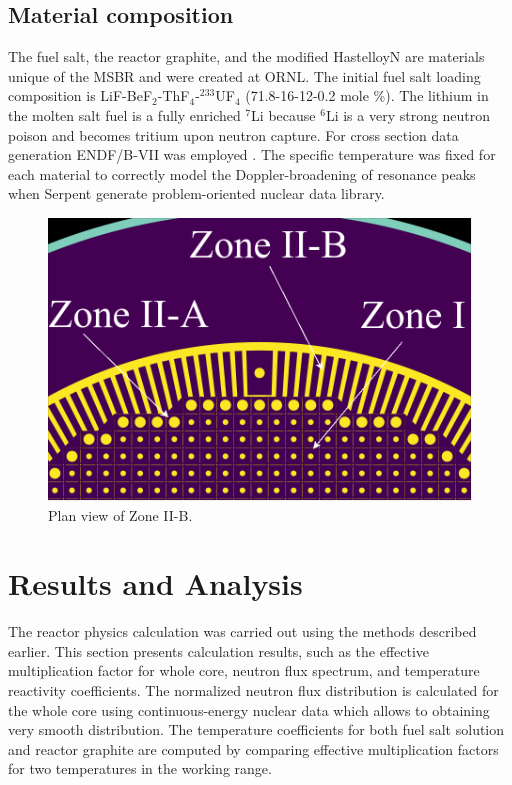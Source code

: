 \documentclass{anstrans}
\begin{document}
\subsection{Material composition}
The fuel salt, the reactor graphite, and the modified HastelloyN are materials 
unique of the \gls{MSBR} and were created at \gls{ORNL}. The initial fuel salt loading composition is LiF-BeF$_2$-ThF$_4$-$^{233}$UF$_4$ (71.8-16-12-0.2 mole \%). The lithium in the molten salt fuel is a fully enriched $^{7}$Li because $^{6}$Li is a very strong neutron poison and becomes tritium upon neutron capture. For cross section data generation ENDF/B-VII was employed \cite{chadwick_endf/b-vii.0:_2006}. The specific temperature was fixed for each material to correctly model the Doppler-broadening of resonance peaks when Serpent generate problem-oriented nuclear data library.
\begin{figure}[htbp!] %
  \centering
  \includegraphics[width=0.96\linewidth]{figure_2_5.png}
  \caption{Plan view of Zone II-B.}
  \label{fig:zone2B}
\end{figure}
\FloatBarrier
\section{Results and Analysis}
The reactor physics calculation was carried out using the methods described earlier. This section presents calculation results, such as the effective multiplication factor for whole core, neutron flux spectrum, and temperature reactivity coefficients. The normalized neutron flux distribution is calculated for the whole core using continuous-energy nuclear data which allows to obtaining very smooth distribution. The temperature coefficients for both fuel salt solution and reactor graphite are computed by comparing effective multiplication factors for two temperatures in the working range.
 	
\end{document}
